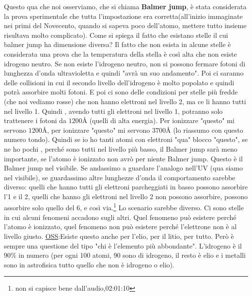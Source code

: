 \documentclass[a4paper,11pt]{article}
\begin{document}
Questo qua che noi osserviamo, che si chiama \textbf{Balmer jump}, è stata considerata la prova sperimentale che tutta l'impostazione era corretta(all'inizio immaginate nei primi del Novecento, quando si sapeva poco dell'atomo, mettere tutto insieme risultava molto complicato).
\newline
Come si spiega il fatto che esistano stelle il cui balmer jump ha dimensione diversa?
\newline
Il fatto che non esista in alcune stelle è considerata una prova che la temperatura della stella  è così alta che non esiste idrogeno neutro. Se non esiste l'idrogeno neutro, non si possono fermare fotoni di lunghezza d'onda ultravioletta e quindi "avrà un suo andamento". Poi ci saranno delle collisioni in cui il secondo livello dell'idrogeno è molto popolato e quindi potrà assorbire molti fotoni. E poi ci sono delle condizioni per stelle più fredde (che noi vediamo rosse) che non hanno elettroni nel livello 2, ma ce li hanno tutti nel livello 1. Quindi , avendo tutti gli elettroni nel livello 1, potranno solo trattenere i fotoni da $1200Å$ (quelli di alta energia). Per ionizzare "questo" mi servono $1200Å$, per ionizzare "questo" mi servono $3700Å$ (lo riassumo con questo numero tondo). Quindi se io ho tanti atomi con elettroni "qua" blocco "questo", se ne ho pochi , perché sono tutti nel livello più basso, il Balmer jump sarà meno importante, se l'atomo è ionizzato non avrò per niente Balmer jump.
\newline
Questo è il Balmer jump nel visibile. 
Se andassimo a guardare l'analogo nell'UV (qua siamo nel visibile), se guardassimo altre lunghezze d'onda il comportamento sarebbe diverso: quelli che hanno tutti gli elettroni parcheggiati in basso possono assorbire l'1 e il 2, quelli che hanno gli elettroni nel livello 2 non possono assorbire, possono assorbire solo quello del 6, e così via.\footnote{non si capisce bene dall'audio,02:01:10} Lo scenario sarebbe diverso.
\newline
Ci sono stelle in cui alcuni fenomeni accadono sugli altri. Quel fenomeno può esistere perché l'atomo è ionizzato, quel fenomeno non può esistere perché l'elettrone non è al livello giusto.
\newline
\underline{OSS}:Esiste questo anche per l'elio, per il litio, per tutto. Però è sempre una questione del tipo "chi è l'elemento più abbondante". L'idrogeno è il $90\%$ in numero (per ogni 100 atomi, 90 sono di idrogeno, il resto è elio e i metalli sono in astrofisica tutto quello che non è idrogeno o elio).
\newline
\end{document}
